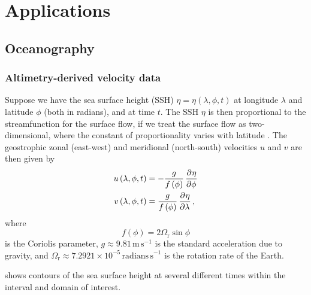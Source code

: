 \chapter{Applications}



\section{Oceanography}\label{sec:appl_ocean}

\subsection{Altimetry-derived velocity data}

Suppose we have the sea surface height (SSH) \(\eta = \eta\left(\lambda, \phi, t\right)\) at longitude \(\lambda\) and latitude \(\phi\) (both in radians), and at time \(t\).
The SSH \(\eta\) is then proportional to the streamfunction for the surface flow, if we treat the surface flow as two-dimensional, where the constant of proportionality varies with latitude \citep{Park_2004_DeterminationSurfaceGeostrophic, DoglioniEtAl_2021_SeaSurfaceHeight}.
The geostrophic zonal (east-west) and meridional (north-south) velocities \(u\) and \(v\) are then given by
\begin{subequations}\label{eqn:}
	\begin{align}
		u\left(\lambda, \phi, t\right) & = -\frac{g}{f\left(\phi\right)}\dpd{\eta}{\phi} \label{eqn:altimetry_u}    \\
		v\left(\lambda, \phi, t\right) & = \frac{g}{f\left(\phi\right)}\dpd{\eta}{\lambda} \label{eqn:altimetry_v},
	\end{align}
\end{subequations}
\label{eqn:altimetry_uv}
where
\[
	f\left(\phi\right) = 2\Omega_{\mathrm{r}}\sin{\phi}
\]
is the Coriolis parameter, \(g \approx 9.81\mathrm{\,m\,s}^{-1}\) is the standard acceleration due to gravity, and \(\Omega_\mathrm{r} \approx 7.2921 \times 10^{-5}\mathrm{\,radians\,s}^{-1}\) is the rotation rate of the Earth.


 shows contours of the sea surface height at several different times within the interval and domain of interest.

\begin{figure}
	\begin{center}
		\caption{}
		\label{fig:na_snapshots}
	\end{center}
\end{figure}






